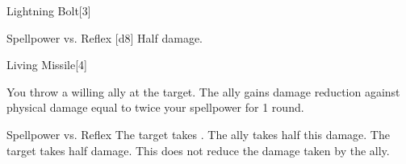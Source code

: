 \begin{spellsection}{Lightning Bolt}[3]
    \begin{spellheader}
    \end{spellheader}
    \begin{spellcontent}
        \begin{spelltargetinginfo}
        \end{spelltargetinginfo}
        \begin{spelleffects}
            \begin{spellattack}{Spellpower vs. Reflex}
                \spellsuccess {}[d8]
                \spellfailure Half damage.
            \end{spellattack}
        \end{spelleffects}
    \end{spellcontent}
    \begin{spellfooter}
        \spellnotes \destructivespellnotes
        \miscastexplode
    \end{spellfooter}
\end{spellsection}

\begin{spellsection}{Living Missile}[4]
    \begin{spellheader}
    \end{spellheader}
    \begin{spellcontent}
        \begin{spelltargetinginfo}
        \end{spelltargetinginfo}
        \begin{spelleffects}
            \spelleffect You throw a willing ally at the target. The ally gains damage reduction against physical damage equal to twice your spellpower for 1 round.
            \begin{spellattack}{Spellpower vs. Reflex}
                \spellsuccess The target takes . The ally takes half this damage.
                \spellfailure The target takes half damage. This does not reduce the damage taken by the ally.
            \end{spellattack}
        \end{spelleffects}
    \end{spellcontent}
    \begin{spellfooter}
        \miscastexplode
    \end{spellfooter}
\end{spellsection}

